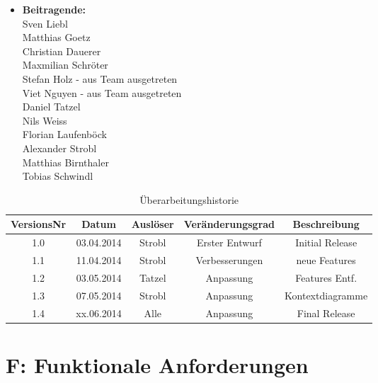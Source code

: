 \documentclass[10pt,a4paper]{scrartcl}
\begin{document}
\newcommand{\Version}{1.2}






\newpage
\begin{itemize}
\item[] \textbf{\large Beitragende:}\\
Sven Liebl\\
Matthias Goetz\\
Christian Dauerer\\
Maxmilian Schröter\\
Stefan Holz - aus Team ausgetreten\\
Viet Nguyen - aus Team ausgetreten \\
Daniel Tatzel\\
Nils Weiss\\
Florian Laufenböck\\
Alexander Strobl\\
Matthias Birnthaler\\
Tobias Schwindl
\end{itemize}

\bigskip

\begin{table}[!h]
 	\centering
	\begin{tabular}{|c|c|c|c||c|}
	\hline
	\textbf{VersionsNr} &  \textbf{Datum} & \textbf{Auslöser} & \textbf{Veränderungsgrad} & \textbf{Beschreibung} \\
	\hline
	1.0 & 03.04.2014 & Strobl & Erster Entwurf & Initial Release \\
	\hline
	1.1 & 11.04.2014 & Strobl & Verbesserungen & neue Features \\
	\hline
	1.2 & 03.05.2014 & Tatzel & Anpassung & Features Entf. \\
	\hline
	1.3 & 07.05.2014 & Strobl & Anpassung & Kontextdiagramme \\
	\hline
	1.4 & xx.06.2014 & Alle & Anpassung & Final Release \\
	\hline
	\end{tabular}

\caption{Überarbeitungshistorie}
\end{table}

\newpage
\tableofcontents


\newpage
\section{F: Funktionale Anforderungen}
\end{document}
